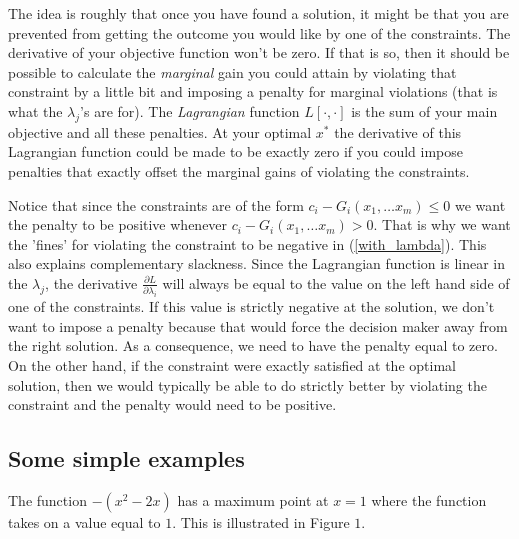 \documentclass{article}
\begin{document}
The idea is roughly that once you have found a solution, it might be that you
are prevented from getting the outcome you would like by one of the
constraints. The derivative of your objective function won't be zero. If that
is so, then it should be possible to calculate the \emph{marginal }gain you
could attain by violating that constraint by a little bit and imposing a
penalty for marginal violations (that is what the $\lambda_{j}$'s are for).
The \emph{Lagrangian} function $L\left[  \cdot,\cdot\right]  $ is the sum of
your main objective and all these penalties. At your optimal $x^{\ast}$ the
derivative of this Lagrangian function could be made to be exactly zero if you
could impose penalties that exactly offset the marginal gains of violating the constraints.

Notice that since the constraints are of the form $c_{i}-G_{i}\left(
x_{1},\dots x_{m}\right)  \leq0$ we want the penalty to be positive whenever
$c_{i}-G_{i}\left(  x_{1},\dots x_{m}\right)  >0$. That is why we want the 'fines'
for violating the constraint to be negative in (\ref{with_lambda}). This also
explains complementary slackness. Since the Lagrangian function is linear in
the $\lambda_{j}$, the derivative $\frac{\partial L}{\partial\lambda_{i}}$
will always be equal to the value on the left hand side of one of the
constraints. If this value is strictly negative at the solution, we don't want
to impose a penalty because that would force the decision maker away from the
right solution. As a consequence, we need to have the penalty equal to zero.
On the other hand, if the constraint were exactly satisfied at the optimal
solution, then we would typically be able to do strictly better by violating
the constraint and the penalty would need to be positive.

\subsection{Some simple examples}

The function $-\left(  x^{2}-2x\right)  $ has a maximum point at $x=1$ where
the function takes on a value equal to $1$. This is illustrated in Figure $1$. %
\end{document}
